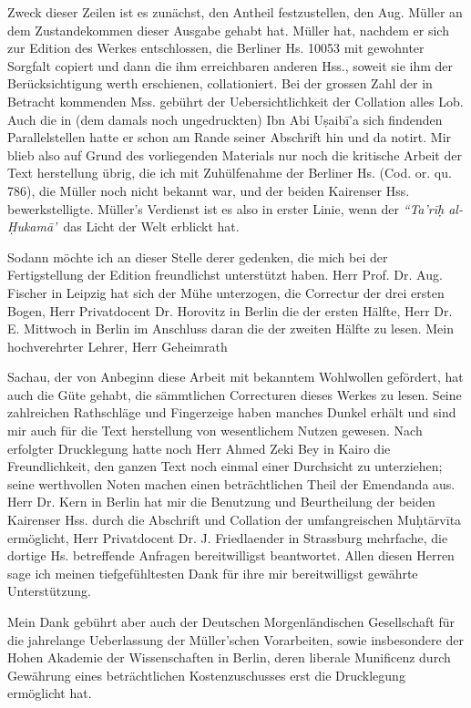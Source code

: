 \documentclass[11pt,a4paper]{article}
\begin{document}
Zweck dieser Zeilen ist es zunächst, den Antheil festzustellen, den Aug. Müller an dem Zustandekommen dieser Ausgabe gehabt hat. Müller hat, nachdem er sich zur Edition des Werkes entschlossen, die Berliner Hs. 10053 mit gewohnter Sorgfalt copiert und dann die ihm erreichbaren anderen Hss., soweit sie ihm der Berücksichtigung werth erschienen, collationiert. Bei der grossen Zahl der in Betracht kommenden Mss. gebührt der Uebersichtlichkeit der Collation alles Lob. Auch die in (dem damals noch ungedruckten) Ibn Abi Uṣaibī'a sich findenden Parallelstellen hatte er schon am Rande seiner Abschrift hin und da notirt. Mir blieb also auf Grund des vorliegenden Materials nur noch die kritische Arbeit der Text herstellung übrig, die ich mit Zuhülfenahme der Berliner Hs. (Cod. or. qu. 786), die Müller noch nicht bekannt war, und der beiden Kairenser Hss. bewerkstelligte. Müller's Verdienst ist es also in erster Linie, wenn der \textit{``Ta'rīḥ al-Ḥukamā'}\ das Licht der Welt erblickt hat.

Sodann möchte ich an dieser Stelle derer gedenken, die mich bei der Fertigstellung der Edition freundlichst unterstützt haben. Herr Prof. Dr. Aug. Fischer in Leipzig hat sich der Mühe unterzogen, die Correctur der drei ersten Bogen, Herr Privatdocent Dr. Horovitz in Berlin die der ersten Hälfte, Herr Dr. E. Mittwoch in Berlin im Anschluss daran die der zweiten Hälfte zu lesen. Mein hochverehrter Lehrer, Herr Geheimrath

\vspace{0.5cm}

Sachau, der von Anbeginn diese Arbeit mit bekanntem Wohlwollen gefördert, hat auch die Güte gehabt, die sämmtlichen Correcturen dieses Werkes zu lesen. Seine zahlreichen Rathschläge und Fingerzeige haben manches Dunkel erhält und sind mir auch für die Text herstellung von wesentlichem Nutzen gewesen. Nach erfolgter Drucklegung hatte noch Herr Ahmed Zeki Bey in Kairo die Freundlichkeit, den ganzen Text noch einmal einer Durchsicht zu unterziehen; seine werthvollen Noten machen einen beträchtlichen Theil der Emendanda aus. Herr Dr. Kern in Berlin hat mir die Benutzung und Beurtheilung der beiden Kairenser Hss. durch die Abschrift und Collation der umfangreischen Muḥtārvīta ermöglicht, Herr Privatdocent Dr. J. Friedlaender in Strassburg mehrfache, die dortige Hs. betreffende Anfragen bereitwilligst beantwortet. Allen diesen Herren sage ich meinen tiefgefühltesten Dank für ihre mir bereitwilligst gewährte Unterstützung.

Mein Dank gebührt aber auch der Deutschen Morgenländischen Gesellschaft für die jahrelange Ueberlassung der Müller'schen Vorarbeiten, sowie insbesondere der Hohen Akademie der Wissenschaften in Berlin, deren liberale Munificenz durch Gewährung eines beträchtlichen Kostenzuschusses erst die Drucklegung ermöglicht hat.
\end{document}
